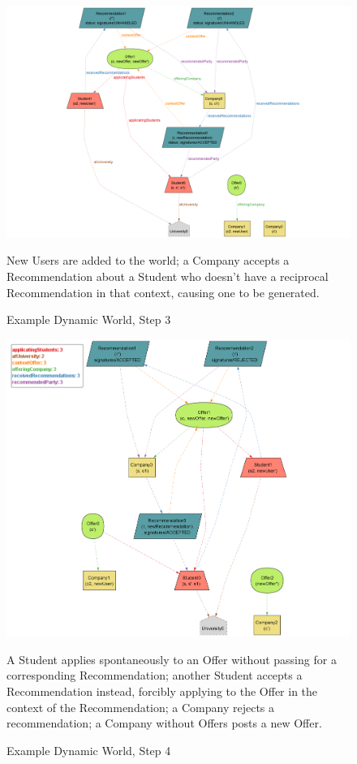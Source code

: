 \begin{figure}[H]
    \begin{center}
        \includegraphics[width=0.7\linewidth]{LaTeXCode/images/Alloy/dynamicWorld_step3_labels.png}
        \caption{Example Dynamic World, Step 3}
        New Users are added to the world; a Company accepts a Recommendation about a Student who doesn't have a reciprocal Recommendation in that context, causing one to be generated.
        \label{fig: dynamicWorld_step3}%
    \end{center}
\end{figure}

\begin{figure}[H]
    \begin{center}
        \includegraphics[width=1\linewidth]{LaTeXCode/images/Alloy/dynamicWorld_step4_with_legenda.png}
        \caption{Example Dynamic World, Step 4}
         A Student applies spontaneously to an Offer without passing for a corresponding Recommendation; another Student accepts a Recommendation instead, forcibly applying to the Offer in the context of the Recommendation; a Company rejects a recommendation; a Company without Offers posts a new Offer.
        \label{fig: dynamicWorld_step4}%
    \end{center}
\end{figure}


